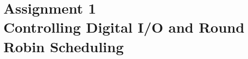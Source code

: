 \section {Assignment 1 \\
    {Controlling Digital I/O and Round Robin Scheduling}}
\label {sec:assignment_1}

